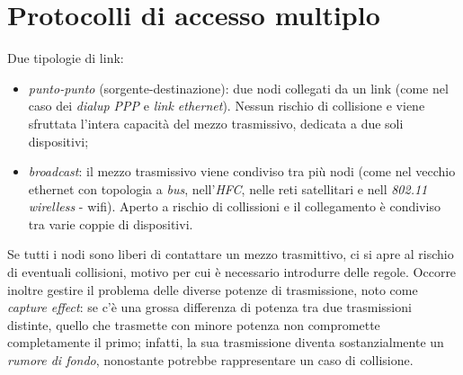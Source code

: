 \section{Protocolli di accesso multiplo}
Due tipologie di link:
\begin{itemize}
	\item \textit{punto-punto} (sorgente-destinazione): due nodi collegati da un link (come nel caso dei \textit{dialup PPP} e \textit{link ethernet}). Nessun rischio di collisione e viene sfruttata l'intera capacità del mezzo trasmissivo, dedicata a due soli dispositivi;
	\item \textit{broadcast}: il mezzo trasmissivo viene condiviso tra più nodi (come nel vecchio ethernet con topologia a \textit{bus}, nell'\textit{HFC}, nelle reti satellitari e nell \textit{802.11 wirelless} - wifi). Aperto a rischio di collissioni e il collegamento è condiviso tra varie coppie di dispositivi.
\end{itemize}
Se tutti i nodi sono liberi di contattare un mezzo trasmittivo, ci si apre al rischio di eventuali collisioni, motivo per cui è necessario introdurre delle regole. Occorre inoltre gestire il problema delle diverse potenze di trasmissione, noto come \textit{capture effect}: se c'è una grossa differenza di potenza tra due trasmissioni distinte, quello che trasmette con minore potenza non compromette completamente il primo; infatti, la sua trasmissione diventa sostanzialmente un \textit{rumore di fondo}, nonostante potrebbe rappresentare un caso di collisione.

